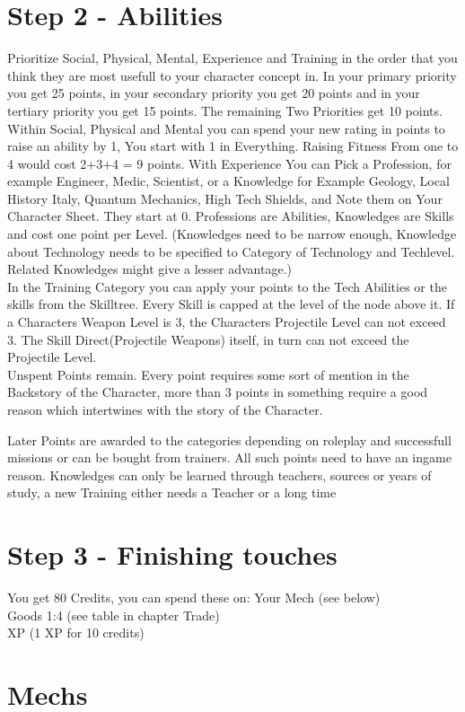 \documentclass{book}
\begin{document}
    \section{Step 2 - Abilities}\label{subsec:step2-Abilities}
    Prioritize Social, Physical, Mental, Experience and Training in the order that you think they are most
    usefull to your character concept in. \newline
    In your primary priority you get 25 points, in your secondary priority you get 20 points and in your tertiary
    priority you get 15 points.
    The remaining Two Priorities get 10 points.\newline
    Within Social, Physical and Mental you can spend your new rating in points to raise an ability by 1, You start with 1
    in Everything.
    Raising Fitness From one to 4 would cost 2+3+4 = 9 points.\newline
    With Experience You can Pick a Profession, for example Engineer, Medic, Scientist, or a Knowledge for Example
    Geology, Local History Italy, Quantum Mechanics, High Tech Shields, and Note them on Your Character Sheet.
    They start at
    0.
    Professions are Abilities, Knowledges are Skills and cost one point per Level. (Knowledges need to be narrow enough,
    Knowledge about Technology needs to be specified to Category of Technology and Techlevel.
    Related Knowledges might give
    a lesser advantage.)\\

    In the Training Category you can apply your points to the Tech Abilities or the skills from the Skilltree.
    Every Skill is capped at the level of the node above it.
    If a Characters Weapon Level is 3, the Characters Projectile
    Level can not exceed 3.
    The Skill Direct(Projectile Weapons) itself, in turn can not exceed the Projectile Level.\\


    Unspent Points remain.
    Every point requires some sort of mention in the Backstory of the Character, more than 3 points
    in something require a good reason which intertwines with the story of the Character.

    Later Points are awarded to the categories depending on roleplay and successfull missions or can be bought from
    trainers.
    All such points need to have an ingame reason.
    Knowledges can only be learned through teachers, sources or
    years of study, a new Training either needs a Teacher or a long time\\


    \section{Step 3 - Finishing touches}\label{subsec:step3-FinishingTouches}
    You get 80 Credits, you can spend these on:
    Your Mech (see below)\\
    Goods 1:4 (see table in chapter Trade)\\
    XP (1 XP for 10 credits)\\

    \section{Mechs}\label{sec:mechs}
    
\end{document}
